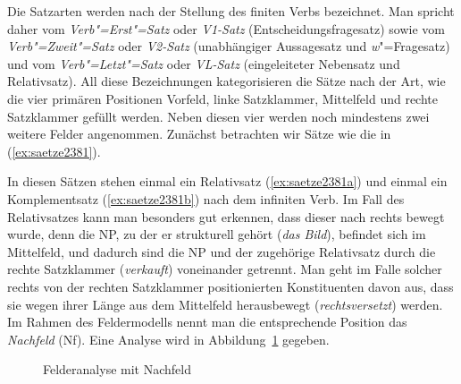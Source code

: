 
Die Satzarten werden nach der Stellung des finiten Verbs bezeichnet.
Man spricht daher vom \textit{Verb"=Erst"=Satz} oder \textit{V1-Satz} (Entscheidungsfragesatz) sowie vom \textit{Verb"=Zweit"=Satz} oder \textit{V2-Satz} (unabhängiger Aussagesatz und \textit{w}"=Fragesatz) und vom \textit{Verb"=Letzt"=Satz} oder \textit{VL-Satz} (eingeleiteter Nebensatz und Relativsatz).
All diese Bezeichnungen kategorisieren die Sätze nach der Art, wie die vier primären Positionen Vorfeld, linke Satzklammer, Mittelfeld und rechte Satzklammer gefüllt werden.
Neben diesen vier werden noch mindestens zwei weitere Felder angenommen.
Zunächst betrachten wir Sätze wie die in (\ref{ex:saetze2381}).

\Enl

\begin{exe}
  \ex\label{ex:saetze2381}
  \begin{xlist}
  \end{xlist}
\end{exe}


In diesen Sätzen stehen einmal ein Relativsatz (\ref{ex:saetze2381a}) und einmal ein Komplementsatz (\ref{ex:saetze2381b}) nach dem infiniten Verb.
Im Fall des Relativsatzes kann man besonders gut erkennen, dass dieser nach rechts bewegt wurde, denn die NP, zu der er strukturell gehört (\textit{das Bild}), befindet sich im Mittelfeld, und dadurch sind die NP und der zugehörige Relativsatz durch die rechte Satzklammer (\textit{verkauft}) voneinander getrennt.
Man geht im Falle solcher rechts von der rechten Satzklammer positionierten Konstituenten davon aus, dass sie wegen ihrer Länge aus dem Mittelfeld herausbewegt (\textit{rechtsversetzt}) werden.
Im Rahmen des Feldermodells nennt man die entsprechende Position das \textit{Nachfeld} (Nf).
Eine Analyse wird in Abbildung~\ref{fig:nachfeld} gegeben.


\begin{figure}[!htbp]
  \centering
  \caption{Felderanalyse mit Nachfeld}
  \label{fig:nachfeld}
\end{figure}

